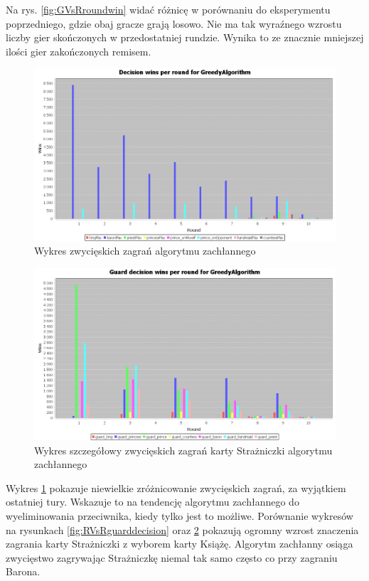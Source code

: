 Na rys. \ref{fig:GVsRroundwin} widać różnicę w porównaniu do eksperymentu poprzedniego, gdzie obaj gracze grają losowo. Nie ma tak wyraźnego wzrostu liczby gier skończonych w przedostatniej rundzie. Wynika to ze znacznie mniejszej ilości gier zakończonych remisem.

\begin{figure}[H]
	\centering
	\includegraphics[width=\textwidth]{Resources/GVsR/GVsRdecision.PNG}
	\caption{Wykres zwycięskich zagrań algorytmu zachłannego} 
	\label{fig:GVsRdecision}
\end{figure} 

\begin{figure}[H]
	\centering
	\includegraphics[width=\textwidth]{Resources/GVsR/GVsRguarddecision.PNG}
	\caption{Wykres szczegółowy zwycięskich zagrań karty Strażniczki algorytmu zachłannego} 
	\label{fig:GVsRguarddecision}
\end{figure}
Wykres \ref{fig:GVsRdecision} pokazuje niewielkie zróżnicowanie zwycięskich zagrań, za wyjątkiem ostatniej tury. Wskazuje to na tendencję algorytmu zachłannego do wyeliminowania przeciwnika, kiedy tylko jest to możliwe.
Porównanie wykresów na rysunkach \ref{fig:RVsRguarddecision} oraz \ref{fig:GVsRguarddecision} pokazują ogromny wzrost znaczenia zagrania karty Strażniczki z wyborem karty Książę. Algorytm zachłanny osiąga zwycięstwo zagrywając Strażniczkę niemal tak samo często co przy zagraniu Barona.

